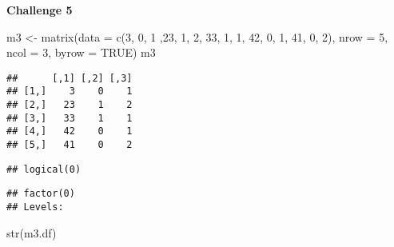 \documentclass[
]{article}
\newenvironment{Shaded}{\begin{snugshade}}{\end{snugshade}}
\newcommand{\AttributeTok}[1]{\textcolor[rgb]{0.77,0.63,0.00}{#1}}
\newcommand{\ConstantTok}[1]{\textcolor[rgb]{0.00,0.00,0.00}{#1}}
\newcommand{\DecValTok}[1]{\textcolor[rgb]{0.00,0.00,0.81}{#1}}
\newcommand{\FunctionTok}[1]{\textcolor[rgb]{0.00,0.00,0.00}{#1}}
\newcommand{\NormalTok}[1]{#1}
\newcommand{\OtherTok}[1]{\textcolor[rgb]{0.56,0.35,0.01}{#1}}
\newcommand{\SpecialCharTok}[1]{\textcolor[rgb]{0.00,0.00,0.00}{#1}}
\begin{document}
\textbf{Challenge 5}

\begin{Shaded}
\begin{Highlighting}[]
\NormalTok{m3 }\OtherTok{\textless{}{-}} \FunctionTok{matrix}\NormalTok{(}\AttributeTok{data =} \FunctionTok{c}\NormalTok{(}\DecValTok{3}\NormalTok{, }\DecValTok{0}\NormalTok{, }\DecValTok{1}\NormalTok{ ,}\DecValTok{23}\NormalTok{, }\DecValTok{1}\NormalTok{, }\DecValTok{2}\NormalTok{, }\DecValTok{33}\NormalTok{, }\DecValTok{1}\NormalTok{, }\DecValTok{1}\NormalTok{, }\DecValTok{42}\NormalTok{, }\DecValTok{0}\NormalTok{, }\DecValTok{1}\NormalTok{, }\DecValTok{41}\NormalTok{, }\DecValTok{0}\NormalTok{, }\DecValTok{2}\NormalTok{), }\AttributeTok{nrow =} \DecValTok{5}\NormalTok{, }\AttributeTok{ncol =} \DecValTok{3}\NormalTok{, }\AttributeTok{byrow =} \ConstantTok{TRUE}\NormalTok{)}
\NormalTok{m3}
\end{Highlighting}
\end{Shaded}

\begin{verbatim}
##      [,1] [,2] [,3]
## [1,]    3    0    1
## [2,]   23    1    2
## [3,]   33    1    1
## [4,]   42    0    1
## [5,]   41    0    2
\end{verbatim}

\begin{Shaded}
\end{Shaded}

\begin{verbatim}
## logical(0)
\end{verbatim}

\begin{Shaded}
\end{Shaded}

\begin{verbatim}
## factor(0)
## Levels:
\end{verbatim}

\begin{Shaded}
\begin{Highlighting}[]
\FunctionTok{str}\NormalTok{(m3.df) }
\end{Highlighting}
\end{Shaded}
\end{document}
